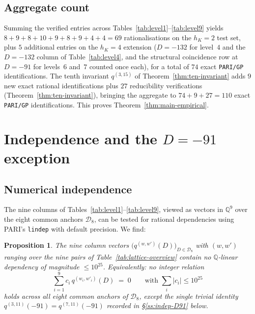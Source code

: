 \documentclass[11pt,a4paper]{amsart}
\theoremstyle{plain}
\newtheorem{proposition}[theorem]{Proposition}
\theoremstyle{definition}
\newcommand{\Q}{\mathbb{Q}}
\newcommand{\qstr}[2]{q^{(#1,#2)}}
\begin{document}
\subsection{Aggregate count}

Summing the verified entries across Tables~\ref{tab:level1}--\ref{tab:level9}
yields $8+9+8+10+9+8+9+4+4 = 69$ rationalisations on the $h_K = 2$ test
set, plus $5$ additional entries on the $h_K = 4$ extension
($D = -132$ for level~$4$ and the $D = -132$ column of
Table~\ref{tab:level4}, and the structural coincidence
row at $D = -91$ for levels~$6$ and~$7$ counted once each), for a total
of $74$ exact \texttt{PARI/GP} identifications. The tenth invariant
$\qstr{3}{15}$ of Theorem~\ref{thm:ten-invariant} adds $9$ new
exact rational identifications plus $27$ reducibility verifications
(Theorem~\ref{thm:ten-invariant}), bringing the aggregate to
$74 + 9 + 27 = 110$ exact \texttt{PARI/GP} identifications.
This proves Theorem~\ref{thm:main-empirical}.

\section{Independence and the $D = -91$ exception}\label{sec:independence}

\subsection{Numerical independence}\label{ss:indep-num}

The nine columns of Tables~\ref{tab:level1}--\ref{tab:level9}, viewed as
vectors in $\Q^9$ over the eight common anchors $\mathcal{D}_8$, can be
tested for rational dependencies using PARI's \texttt{lindep} with default
precision. We find:

\begin{proposition}\label{prop:indep}
The nine column vectors
$\bigl(\qstr{w}{w'}(D)\bigr)_{D\in\mathcal{D}_8}$ with $(w, w')$ ranging over
the nine pairs of Table~\ref{tab:lattice-overview} contain no $\Q$-linear
dependency of magnitude $\le 10^{25}$. Equivalently: no integer relation
\[
\sum_{i=1}^{9} c_i\,\qstr{w_i}{w'_i}(D) \;=\; 0
\qquad\text{with } \sum_i\lvert c_i\rvert \le 10^{25}
\]
holds across all eight common anchors of $\mathcal{D}_8$,
except the single trivial identity $\qstr{3}{11}(-91) = \qstr{7}{11}(-91)$
recorded in \S\ref{ss:indep-D91} below.
\end{proposition}
\end{document}
